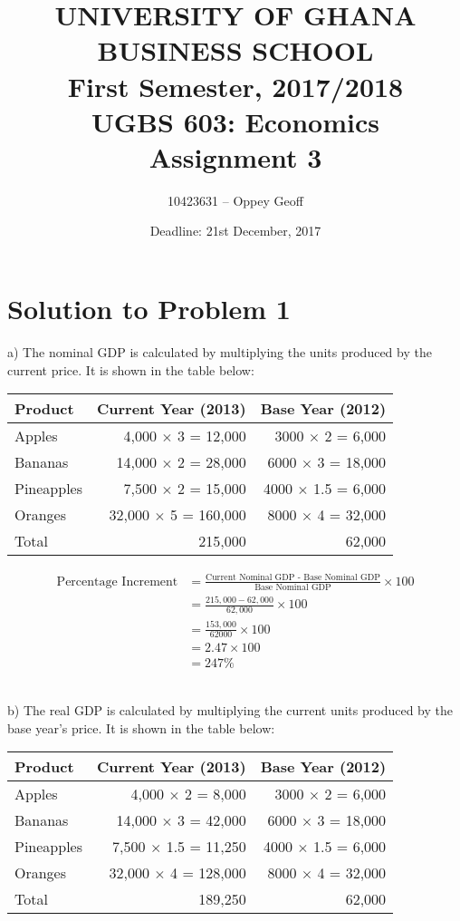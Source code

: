 \documentclass[12pt]{article}
\title{\textbf{UNIVERSITY OF GHANA BUSINESS SCHOOL\\ \vspace{0.5cm}
	First Semester, 2017/2018\\ %
	UGBS 603: Economics\\
	Assignment 3}}
\date{Deadline: 21st December, 2017}
\author{10423631 -- Oppey Geoff}
\begin{document}
\maketitle
\thispagestyle{empty} %
\clearpage

\section*{Solution to Problem 1}
\setcounter{page}{1} %
a) The nominal GDP is calculated by multiplying the units produced by the current price. It is shown in the table below:

\begin{tabular}{|l|r|r|}
	\hline
	Product    & Current Year (2013)         & Base Year (2012)         \\
	\hline
	Apples     & 4,000 $\times$ 3 = 12,000   & 3000 $\times$ 2 =  6,000 \\
	Bananas    & 14,000 $\times$ 2 = 28,000  & 6000 $\times$ 3 = 18,000 \\
	Pineapples & 7,500 $\times$ 2 = 15,000   & 4000 $\times$ 1.5 = 6,000\\
	Oranges    & 32,000 $\times$ 5 = 160,000 & 8000 $\times$ 4 = 32,000 \\
	\hline
	Total      & 215,000                     & 62,000 \\
	\hline
\end{tabular}

\begin{equation*}
	\begin{split}
		\text{Percentage Increment}  &= \frac{\text{Current Nominal GDP - Base Nominal GDP}}{\text{Base Nominal GDP}} \times 100\\
		&= \frac{215,000 - 62,000}{62,000} \times 100\\
		&= \frac{153,000}{62000} \times 100\\
		&= 2.47 \times 100\\
		&= 247 \%
	\end{split}
\end{equation*}\\
\vspace{0.5cm}

b) The real GDP is calculated by multiplying the current units produced by the base year's price. It is shown in the table below:

\begin{tabular}{|l|r|r|}
	\hline
	Product    & Current Year (2013)         & Base Year (2012)         \\
	\hline
	Apples     & 4,000 $\times$ 2 = 8,000   & 3000 $\times$ 2 =  6,000 \\
	Bananas    & 14,000 $\times$ 3 = 42,000  & 6000 $\times$ 3 = 18,000 \\
	Pineapples & 7,500 $\times$ 1.5 = 11,250   & 4000 $\times$ 1.5 = 6,000\\
	Oranges    & 32,000 $\times$ 4 = 128,000 & 8000 $\times$ 4 = 32,000 \\
	\hline
	Total      & 189,250                     & 62,000 \\
	\hline
\end{tabular}
\end{document}
